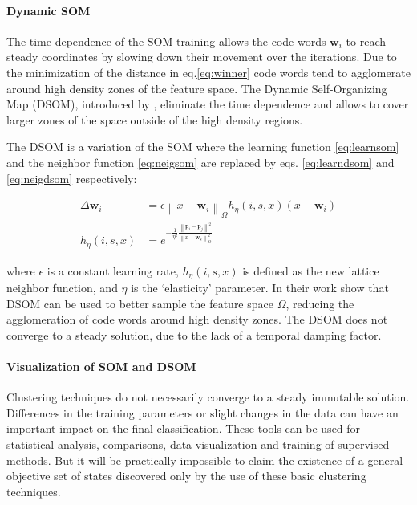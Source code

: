 \documentclass[utf8]{frontiersSCNS} %
\begin{document}
\paragraph{Dynamic SOM}
The time dependence of the SOM training allows the code words $\boldsymbol{w}_i$ to reach steady coordinates by slowing down their movement over the iterations. Due to the minimization of the distance in eq.\eqref{eq:winner} code words tend to agglomerate around high density zones of the feature space. The Dynamic Self-Organizing Map (DSOM), introduced by \citep{Rougier2011}, eliminate the time dependence and allows to cover larger zones of the space outside of the high density regions.

The DSOM is a variation of the SOM where the learning function \eqref{eq:learnsom} and the neighbor function \eqref{eq:neigsom} are replaced by eqs. \eqref{eq:learndsom} and \eqref{eq:neigdsom} respectively:

\begin{align}
\Delta \boldsymbol{w}_i & = \epsilon \left\lVert x - \boldsymbol{w}_i \right\rVert_\Omega h_\eta(i,s,x)(x-\boldsymbol{w}_i) \label{eq:learndsom} \\
h_\eta(i,s,x) & = e^{-\frac{1}{\eta^2}\frac{\left\lVert \boldsymbol{p}_i - \boldsymbol{p}_j \right\rVert^2}{\left\lVert x - \boldsymbol{w}_s \right\rVert_\Omega^2}} \label{eq:neigdsom} 
\end{align}

where $\epsilon$ is a constant learning rate, $h_\eta(i,s,x)$ is defined as the new lattice neighbor function, and $\eta$ is the `elasticity' parameter. In their work \citep{Rougier2011} show that DSOM can be used to better sample the feature space $\Omega$, reducing the agglomeration of code words around high density zones. The DSOM does not converge to a steady solution, due to the lack of a temporal damping factor.

\paragraph{Visualization of SOM and DSOM}
Clustering techniques do not necessarily converge to a steady immutable solution. Differences in the training parameters or slight changes in the data can have an important impact on the final classification. These tools can be used for statistical analysis, comparisons, data visualization and training of supervised methods. But it will be practically impossible to claim the existence of a general objective set of states discovered only by the use of these basic clustering techniques.
\end{document}
